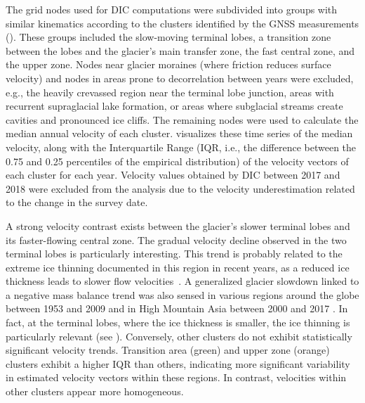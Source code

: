 The grid nodes used for DIC computations were subdivided into groups with similar kinematics according to the clusters identified by the GNSS measurements (). 
These groups included the slow-moving terminal lobes, a transition zone between the lobes and the glacier's main transfer zone, the fast central zone, and the upper zone.  
Nodes near glacier moraines (where friction reduces surface velocity) and nodes in areas prone to decorrelation between years were excluded, e.g., the heavily crevassed region near the terminal lobe junction, areas with recurrent supraglacial lake formation, or areas where subglacial streams create cavities and pronounced ice cliffs.
The remaining nodes were used to calculate the median annual velocity of each cluster. 
 visualizes these time series of the median velocity, along with the Interquartile Range (IQR, i.e., the difference between the 0.75 and 0.25 percentiles of the empirical distribution) of the velocity vectors of each cluster for each year.
Velocity values obtained by DIC between 2017 and 2018 were excluded from the analysis due to the velocity underestimation related to the change in the survey date. 

A strong velocity contrast exists between the glacier's slower terminal lobes and its faster-flowing central zone.  
The gradual velocity decline observed in the two terminal lobes is particularly interesting. 
This trend is probably related to the extreme ice thinning documented in this region in recent years, as a reduced ice thickness leads to slower flow velocities~\citep{Cuffey2010_physics_glaciers,jiskoot2011dynamics_glacier}.
A generalized glacier slowdown linked to a negative mass balance trend was also sensed in various regions around the globe between 1953 and 2009 \cite{Heid2012a} and in  High Mountain Asia between 2000 and 2017 \cite{Dehecq2019}.
In fact, at the terminal lobes, where the ice thickness is smaller, the ice thinning is particularly relevant (see ).
Conversely, other clusters do not exhibit statistically significant velocity trends.
Transition area (green) and upper zone (orange) clusters exhibit a higher IQR than others, indicating more significant variability in estimated velocity vectors within these regions. 
In contrast, velocities within other clusters appear more homogeneous.

